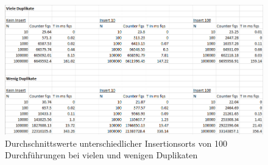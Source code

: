 \documentclass[11pt]{scrartcl}
\begin{document}
\begin{figure}
\includegraphics[width=\linewidth]{insertiontable.png}
\caption{Durchschnittswerte unterschiedlicher Insertionsorts von 100 Durchführungen bei vielen und wenigen Duplikaten}
\label{figure:table}
\end{figure}
\end{document}
